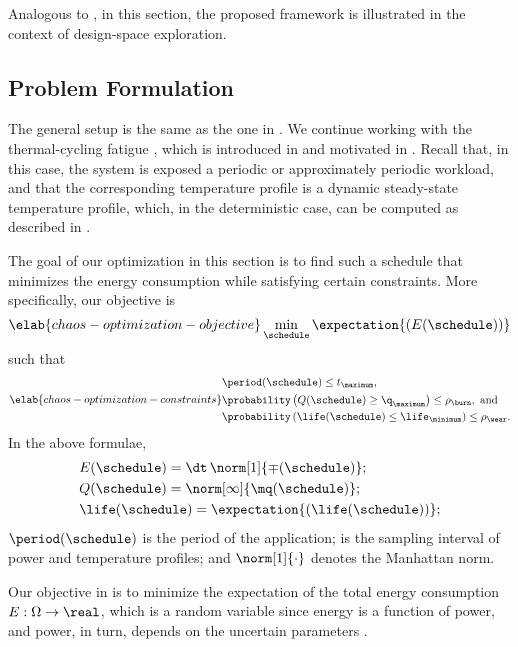 Analogous to , in this section, the proposed
framework is illustrated in the context of design-space exploration.

\subsection{Problem Formulation}

The general setup is the same as the one in . We
continue working with the thermal-cycling fatigue \cite{jedec2016}, which is
introduced in  and motivated in
. Recall that, in this case, the system is
exposed a periodic or approximately periodic workload, and that the
corresponding temperature profile is a dynamic steady-state temperature profile,
which, in the deterministic case, can be computed as described in
.

The goal of our optimization in this section is to find such a schedule
\schedule that minimizes the energy consumption while satisfying certain
constraints. More specifically, our objective is
\begin{equation} \elab{chaos-optimization-objective}
  \min_{\schedule} \expectation{(E(\schedule))}
\end{equation}
such that
\begin{equation} \elab{chaos-optimization-constraints}
  \begin{split}
    & \period(\schedule) \leq t_\maximum, \\
    & \probability\left(Q(\schedule) \geq \q_\maximum\right) \leq \rho_\burn, \text{ and} \\
    & \probability\left(\life(\schedule) \leq \life_\minimum\right) \leq \rho_\wear.
  \end{split}
\end{equation}
In the above formulae,
\begin{align*}
  & E(\schedule) = \dt \, \norm[1]{\mp(\schedule)}; \\
  & Q(\schedule) = \norm[\infty]{\mq(\schedule)}; \\
  & \life(\schedule) = \expectation{\left(\life(\schedule)\right)};
\end{align*}
$\period(\schedule)$ is the period of the application; \dt is the sampling
interval of power and temperature profiles; and $\norm[1]{\cdot}$ denotes the
Manhattan norm.

Our objective in  is to minimize the
expectation of the total energy consumption $E: \Omega \to \real$, which is a
random variable since energy is a function of power, and power, in turn, depends
on the uncertain parameters \vu.

